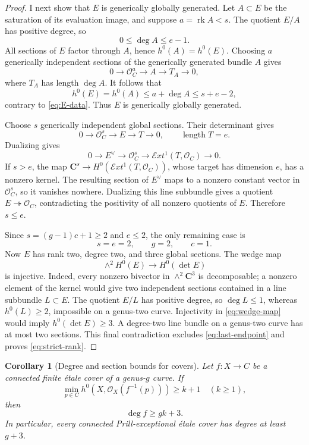 \documentclass[11pt,reqno]{amsart}
\numberwithin{equation}{section}
\newtheorem{corollary}[corollary]{Corollary}
\theoremstyle{remark}
\DeclareMathOperator{\rk}{rk}
\newcommand{\cO}{\mathcal O}
\newcommand{\bC}{\mathbf C}
\begin{document}
\begin{proof}
I next show that \(E\) is generically globally generated.  Let
\(A\subset E\) be the saturation of its evaluation image, and suppose
\(a=\rk A<s\).  The quotient \(E/A\) has positive degree, so
\[
 0\leq\deg A\leq e-1.
\]
All sections of \(E\) factor through \(A\), hence \(h^0(A)=h^0(E)\).
Choosing \(a\) generically independent sections of the generically
generated bundle \(A\) gives
\[
 0\longrightarrow\cO_C^a\longrightarrow A\longrightarrow T_A
 \longrightarrow0,
\]
where \(T_A\) has length \(\deg A\).  It follows that
\[
 h^0(E)=h^0(A)\leq a+\deg A
 \leq s+e-2,
\]
contrary to \eqref{eq:E-data}.  Thus \(E\) is generically globally
generated.

Choose \(s\) generically independent global sections.  Their determinant
gives
\[
 0\longrightarrow\cO_C^s\longrightarrow E\longrightarrow T
 \longrightarrow0,\qquad \operatorname{length}T=e.
\tag{6.9}\label{eq:E-evaluation}
\]
Dualizing gives
\[
 0\longrightarrow E^\vee\longrightarrow\cO_C^s
 \longrightarrow\mathcal Ext^1(T,\cO_C)\longrightarrow0.
\tag{6.10}\label{eq:E-dual-evaluation}
\]
If \(s>e\), the map
\(\bC^s\to H^0(\mathcal Ext^1(T,\cO_C))\), whose target has dimension
\(e\), has a nonzero kernel.  The resulting section of \(E^\vee\) maps
to a nonzero constant vector in \(\cO_C^s\), so it vanishes nowhere.
Dualizing this line subbundle gives a quotient \(E\twoheadrightarrow
\cO_C\), contradicting the positivity of all nonzero quotients of \(E\).
Therefore \(s\leq e\).

Since \(s=(g-1)c+1\geq2\) and \(e\leq2\), the only remaining case is
\[
 s=e=2,\qquad g=2,\qquad c=1.
\tag{6.11}\label{eq:last-endpoint}
\]
Now \(E\) has rank two, degree two, and three global sections.  The
wedge map
\[
 \wedge^2H^0(E)\longrightarrow H^0(\det E)
\tag{6.12}\label{eq:wedge-map}
\]
is injective.  Indeed, every nonzero bivector in
\(\wedge^2\bC^3\) is decomposable; a nonzero element of the kernel would
give two independent sections contained in a line subbundle
\(L\subset E\).  The quotient \(E/L\) has positive degree, so
\(\deg L\leq1\), whereas \(h^0(L)\geq2\), impossible on a genus-two
curve.  Injectivity in \eqref{eq:wedge-map} would imply
\(h^0(\det E)\geq3\).  A degree-two line bundle on a genus-two curve has
at most two sections.  This final contradiction excludes
\eqref{eq:last-endpoint} and proves \eqref{eq:strict-rank}.
\end{proof}

\begin{corollary}[Degree and section bounds for covers]\label{cor:cover-lower-bound}
Let \(f\colon X\to C\) be a connected finite \'etale cover of a
genus-\(g\) curve.  If
\[
 \min_{p\in C}
 h^0\!\left(X,\cO_X(f^{-1}(p))\right)\geq k+1
\quad(k\geq1),
\tag{6.13}\label{eq:k-sections}
\]
then
\[
 \deg f\geq gk+3.
\tag{6.14}\label{eq:degree-lower}
\]
In particular, every connected Prill-exceptional \'etale cover has
degree at least \(g+3\).
\end{corollary}
\end{document}
